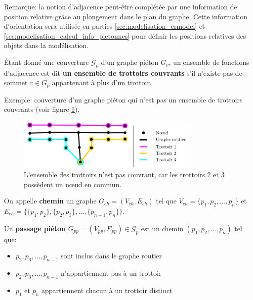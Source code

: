 \noindent
Remarque: la notion d'adjacence peut-être complétée par une information de position relative grâce au plongement dans le plan du graphe. Cette information d'orientation sera utilisée en parties \ref{sec:modelisation_crmodel} et \ref{sec:modelisation_calcul_info_pietonnes} pour définir les positions relatives des objets dans la modélisation.

\newpage

\begin{definition}
    Étant donné une couverture $\mathcal{G}_p$ d'un graphe piéton $G_p$, un ensemble de fonctions d'adjacence est dit \textbf{un ensemble de trottoirs couvrants} s'il n'existe pas de sommet $v \in G_p$ appartenant à plus d'un trottoir.
\end{definition}

\noindent
Exemple: couverture d'un graphe piéton qui n'est pas un ensemble de trottoirs couvrants (voir figure \ref{fig:mod_ex_trottoirs_couvrants}).

\begin{figure}[ht]
    \centering
    \includegraphics[width=0.8\textwidth]{images/modelisation/graphe/trottoirs_non_couvrants.pdf}
    \caption[Ensemble de trottoirs non-couvrants]{L'ensemble des trottoirs n'est pas couvrant, car les trottoirs 2 et 3 possèdent un nœud en commun.}
    \label{fig:mod_ex_trottoirs_couvrants}
\end{figure}

\begin{definition}
    On appelle \textbf{chemin} un graphe $G_{ch} = (V_{ch}, E_{ch})$ tel que $V_{ch}=\{p_1,p_2,\dots,p_n\}$ et $E_{ch}=\{\{p_1,p_2\},\{p_2,p_3\},\dots,\{p_{n-1},p_n\}\}$.
\end{definition}

\begin{definition}
    Un \textbf{passage piéton} $G_{pp} = (V_{pp}, E_{pp}) \in \mathcal{G}_p$ est un chemin $(p_1, p_2,\dots, p_n)$ tel que:

    \begin{itemize}
        \item $p_2, p_3, \dots, p_{n-1}$ sont inclus dans le graphe routier
        \item $p_2, p_3, \dots, p_{n-1}$ n'appartiennent pas à un trottoir
        \item $p_1$ et $p_n$ appartiennent chacun à un trottoir distinct
    \end{itemize}
\end{definition}

